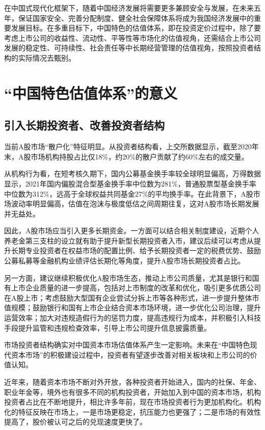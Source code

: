 \documentclass{ctexart}
\begin{document}
在中国式现代化框架下，随着中国经济发展将需要更多兼顾安全与发展，在未来五年，保证国家安全、完善分配制度、健全社会保障体系将成为我国经济发展中的重要发展目标。在多重目标下，中国特色的估值体系，即在投资定价过程中，除了要考虑上市公司的收益性、流动性、平等性等市场化的估值视角，还需结合上市公司发展的稳定性、可持续性、社会责任等中长期经营管理的估值视角，按照投资者结构的实际情况去甄别。

\section*{“中国特色估值体系”的意义}
\subsection*{引入长期投资者、改善投资者结构}
当前A股市场“散户化”特征明显。从投资者结构看，上交所数据显示，截至2020年末，A股市场机构持股占比仅18\%，约20\%的散户贡献了约60\%左右的成交量。

从机构行为看，在短考核久期下，国内公募基金换手率较全球明显偏高，万得数据显示，2021年国内偏股混合型基金换手率中位数为281\%，普通股票型基金换手率中位数为312\%，远高于全球权益共同基金27\%的平均换手率。在此背景下，A股市场波动率明显偏高，估值在泡沫与极度低估之间周期往复，这对A股市场长期发展并无益处。

因此，A股市场应当引入更多长期资金。一方面可以结合相关制度建设，近期个人养老金第三支柱的设立就有助于提升新型长期投资者入市，建议后续可以考虑从提升长期专业投资者在权益市场的配置比例、给予长期投资者一定的税费优势、鼓励公募私募等金融机构业绩评估长期化等角度，提升A股市场长期投资者占比。

另一方面，建议继续积极优化A股市场生态，推动上市公司质量，尤其是银行和国有上市企业质量的进一步提高，包括对上市制度的改革和优化，吸引更多优质公司在A股上市；考虑鼓励大型国有企业尝试分拆上市等各种形式，进一步提升整体市值规模；鼓励银行和国有上市企业结合资本市场环境，进一步优化公司治理，提升运营效率；加大对违规造假行为的惩罚力度，提高违规行为成本，并积极引入科技手段提升监管和违规检查效率，引导上市公司提升信息披露质量。

市场投资者结构确实对中国资本市场估值体系产生一定影响。未来在“中国特色现代资本市场”的积极建设过程中，投资者有望逐步改善对相关板块和上市公司的价值认知。

近年来，随着资本市场不断对外开放，各种投资者开始进入，国内的社保、年金、职业年金等，境外也有很多不同的机构投资者，开始加入到中国的资本市场，机构投资者占比在不断地提升，相比许多年前，现在市场投资者行为更加机构化。机构化的特征反映在市场上，一是市场更稳定，抗压能力也更强了；二是市场的有效性提高了，股价被认可之后的兑现速度更快了。
\end{document}

